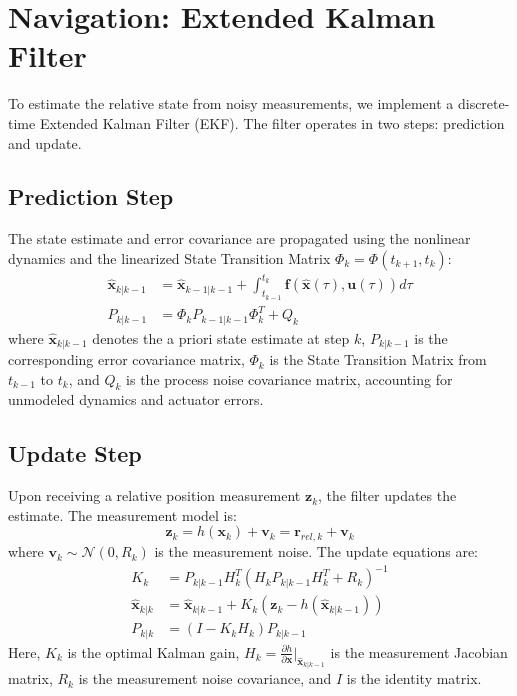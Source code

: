 \documentclass[10pt,letterpaper]{article}
\begin{document}
\section{Navigation: Extended Kalman Filter}

To estimate the relative state from noisy measurements, we implement a discrete-time Extended Kalman Filter (EKF). The filter operates in two steps: prediction and update.

\subsection{Prediction Step}
The state estimate and error covariance are propagated using the nonlinear dynamics and the linearized State Transition Matrix $\Phi_k = \Phi(t_{k+1}, t_k)$:
\begin{align}
    \hat{\mathbf{x}}_{k|k-1} &= \hat{\mathbf{x}}_{k-1|k-1} + \int_{t_{k-1}}^{t_k} \mathbf{f}(\hat{\mathbf{x}}(\tau), \mathbf{u}(\tau)) d\tau \\
    P_{k|k-1} &= \Phi_k P_{k-1|k-1} \Phi_k^T + Q_k
\end{align}
where $\hat{\mathbf{x}}_{k|k-1}$ denotes the a priori state estimate at step $k$, $P_{k|k-1}$ is the corresponding error covariance matrix, $\Phi_k$ is the State Transition Matrix from $t_{k-1}$ to $t_k$, and $Q_k$ is the process noise covariance matrix, accounting for unmodeled dynamics and actuator errors.

\subsection{Update Step}
Upon receiving a relative position measurement $\mathbf{z}_k$, the filter updates the estimate. The measurement model is:
\begin{equation}
    \mathbf{z}_k = h(\mathbf{x}_k) + \mathbf{v}_k = \mathbf{r}_{rel, k} + \mathbf{v}_k
\end{equation}
where $\mathbf{v}_k \sim \mathcal{N}(0, R_k)$ is the measurement noise. The update equations are:
\begin{align}
    K_k &= P_{k|k-1} H_k^T (H_k P_{k|k-1} H_k^T + R_k)^{-1} \\
    \hat{\mathbf{x}}_{k|k} &= \hat{\mathbf{x}}_{k|k-1} + K_k (\mathbf{z}_k - h(\hat{\mathbf{x}}_{k|k-1})) \\
    P_{k|k} &= (I - K_k H_k) P_{k|k-1}
\end{align}
Here, $K_k$ is the optimal Kalman gain, $H_k = \frac{\partial h}{\partial \mathbf{x}}|_{\hat{\mathbf{x}}_{k|k-1}}$ is the measurement Jacobian matrix, $R_k$ is the measurement noise covariance, and $I$ is the identity matrix.
\end{document}
